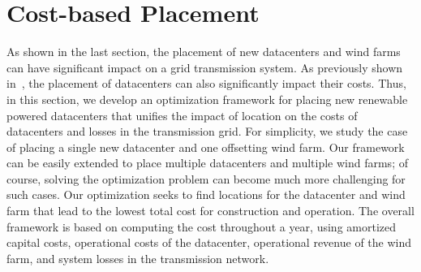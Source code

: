 \section{Cost-based Placement}
\label{sec:framework}

As shown in the last section, the placement of new datacenters and wind farms can have significant impact on a grid transmission system.  As previously shown in~\cite{berral2014building,Goiri11place}, the placement of datacenters can also significantly impact their costs.  Thus, in this section, we develop an optimization framework for placing new renewable powered datacenters that unifies the impact of location on the costs of datacenters and losses in the transmission grid.  For simplicity, we study the case of placing a single new datacenter and one offsetting wind farm.  Our framework can be easily extended to place multiple datacenters and multiple wind farms; of course, solving the optimization problem can become much more challenging for such cases.  Our optimization seeks to find locations for the datacenter and wind farm that lead to the lowest total cost for construction and operation.  The overall framework is based on computing the cost throughout a year, using amortized capital costs, operational costs of the datacenter, operational revenue of the wind farm, and system losses in the transmission network.


